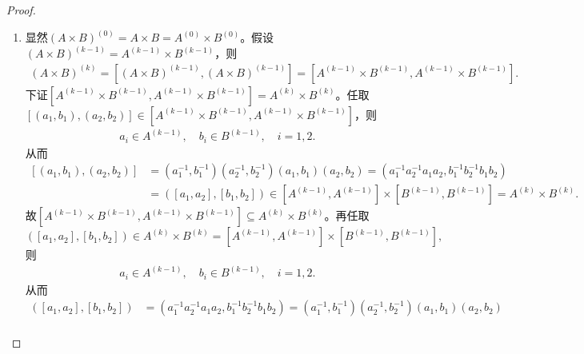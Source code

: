 \documentclass[../../main.tex]{subfiles}%
\begin{document}
\begin{proof}
\begin{enumerate}[(1)]
\item 显然$\left( A\times B \right) ^{\left( 0 \right)}=A\times B=A^{\left( 0 \right)}\times B^{\left( 0 \right)}$。假设$\left( A\times B \right) ^{\left( k-1 \right)}=A^{\left( k-1 \right)}\times B^{\left( k-1 \right)}$，则
\begin{align}
\left( A\times B \right) ^{\left( k \right)}=\left[ \left( A\times B \right) ^{\left( k-1 \right)},\left( A\times B \right) ^{\left( k-1 \right)} \right] =\left[ A^{\left( k-1 \right)}\times B^{\left( k-1 \right)},A^{\left( k-1 \right)}\times B^{\left( k-1 \right)} \right].\label{eq:::--q89h2dfwfzznmnghmghkhlyujf21.2}
\end{align}
下证$\left[ A^{\left( k-1 \right)}\times B^{\left( k-1 \right)},A^{\left( k-1 \right)}\times B^{\left( k-1 \right)} \right] =A^{\left( k \right)}\times B^{\left( k \right)}$。任取$\left[ \left( a_1,b_1 \right) ,\left( a_2,b_2 \right) \right] \in \left[ A^{\left( k-1 \right)}\times B^{\left( k-1 \right)},A^{\left( k-1 \right)}\times B^{\left( k-1 \right)} \right]$，则
\begin{align*}
a_i\in A^{\left( k-1 \right)},\quad b_i\in B^{\left( k-1 \right)},\quad i=1,2.
\end{align*}
从而
\begin{align*}
\left[ \left( a_1,b_1 \right) ,\left( a_2,b_2 \right) \right] &=\left( a_{1}^{-1},b_{1}^{-1} \right) \left( a_{2}^{-1},b_{2}^{-1} \right) \left( a_1,b_1 \right) \left( a_2,b_2 \right) =\left( a_{1}^{-1}a_{2}^{-1}a_1a_2,b_{1}^{-1}b_{2}^{-1}b_1b_2 \right) \\
&=\left( \left[ a_1,a_2 \right] ,\left[ b_1,b_2 \right] \right) \in \left[ A^{\left( k-1 \right)},A^{\left( k-1 \right)} \right] \times \left[ B^{\left( k-1 \right)},B^{\left( k-1 \right)} \right] =A^{\left( k \right)}\times B^{\left( k \right)}.
\end{align*}
故$\left[ A^{\left( k-1 \right)}\times B^{\left( k-1 \right)},A^{\left( k-1 \right)}\times B^{\left( k-1 \right)} \right] \subseteq A^{\left( k \right)}\times B^{\left( k \right)}$。再任取$$\left( \left[ a_1,a_2 \right] ,\left[ b_1,b_2 \right] \right) \in A^{\left( k \right)}\times B^{\left( k \right)}=\left[ A^{\left( k-1 \right)},A^{\left( k-1 \right)} \right] \times \left[ B^{\left( k-1 \right)},B^{\left( k-1 \right)} \right],$$则
\begin{align*}
a_i\in A^{\left( k-1 \right)},\quad b_i\in B^{\left( k-1 \right)},\quad i=1,2.
\end{align*}
从而
\begin{align*}
\left( \left[ a_1,a_2 \right] ,\left[ b_1,b_2 \right] \right) &=\left( a_{1}^{-1}a_{2}^{-1}a_1a_2,b_{1}^{-1}b_{2}^{-1}b_1b_2 \right) =\left( a_{1}^{-1},b_{1}^{-1} \right) \left( a_{2}^{-1},b_{2}^{-1} \right) \left( a_1,b_1 \right) \left( a_2,b_2 \right) \\

\end{align*}
\end{enumerate}
\end{proof}
\end{document}

